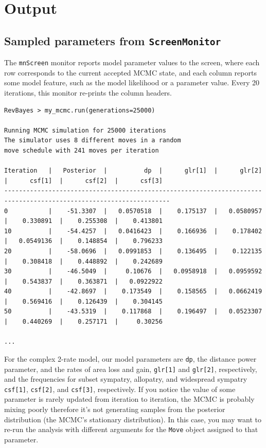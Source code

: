 \documentclass[11pt]{article}
\begin{document}
\section{Output}

\subsection{Sampled parameters from {\tt ScreenMonitor}}

The {\tt mnScreen} monitor reports model parameter values to the screen, where each row corresponds to the current accepted MCMC state, and each column reports some model feature, such as the model likelihood or a parameter value.
Every 20 iterations, this monitor re-prints the column headers.

\begin{snugshade}
\begin{lstlisting}[basicstyle=\tiny \listingsfont, columns=texcl]
RevBayes > my_mcmc.run(generations=25000)

Running MCMC simulation for 25000 iterations
The simulator uses 8 different moves in a random
move schedule with 241 moves per iteration

Iteration   |   Posterior  |          dp  |      glr[1]  |      glr[2]  |      csf[1]  |      csf[2]  |      csf[3]
-------------------------------------------------------------------------------------------------------------------
0           |    -51.3307  |   0.0570518  |    0.175137  |   0.0580957  |    0.330891  |    0.255308  |    0.413801
10          |    -54.4257  |   0.0416423  |    0.166936  |    0.178402  |   0.0549136  |    0.148854  |    0.796233
20          |    -58.0696  |   0.0991853  |    0.136495  |    0.122135  |    0.308418  |    0.448892  |    0.242689
30          |    -46.5049  |     0.10676  |   0.0958918  |   0.0959592  |    0.543837  |    0.363871  |   0.0922922
40          |    -42.8697  |    0.173549  |    0.158565  |   0.0662419  |    0.569416  |    0.126439  |    0.304145
50          |    -43.5319  |    0.117868  |    0.196497  |   0.0523307  |    0.440269  |    0.257171  |     0.30256

...
\end{lstlisting}
\end{snugshade}

For the complex 2-rate model, our model parameters are {\tt dp}, the distance power parameter, and the rates of area loss and gain, {\tt glr[1]} and {\tt glr[2]}, respectively, and the frequencies for subset sympatry, allopatry, and widespread sympatry {\tt csf[1]}, {\tt csf[2]}, and {\tt csf[3]}, respectively. 
If you notice the value of some parameter is rarely updated from iteration to iteration, the MCMC is probably mixing poorly therefore it's not generating samples from the posterior distribution (the MCMC's stationary distribution).
In this case, you may want to re-run the analysis with different arguments for the {\tt Move} object assigned to that parameter.
\end{document}
